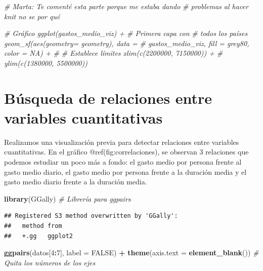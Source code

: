 \documentclass[data,article,submit,moreauthors,pdftex]{Definitions/mdpi}
\newenvironment{Shaded}{\begin{snugshade}}{\end{snugshade}}
\newcommand{\AttributeTok}[1]{\textcolor[rgb]{0.13,0.29,0.53}{#1}}
\newcommand{\CommentTok}[1]{\textcolor[rgb]{0.56,0.35,0.01}{\textit{#1}}}
\newcommand{\ConstantTok}[1]{\textcolor[rgb]{0.56,0.35,0.01}{#1}}
\newcommand{\DecValTok}[1]{\textcolor[rgb]{0.00,0.00,0.81}{#1}}
\newcommand{\FunctionTok}[1]{\textcolor[rgb]{0.13,0.29,0.53}{\textbf{#1}}}
\newcommand{\NormalTok}[1]{#1}
\newcommand{\SpecialCharTok}[1]{\textcolor[rgb]{0.81,0.36,0.00}{\textbf{#1}}}
\begin{document}
\begin{Shaded}
\begin{Highlighting}[]
\CommentTok{\# Marta: Te comenté esta parte porque me estaba dando}
\CommentTok{\# problemas al hacer knit no se por qué}

\CommentTok{\# Gráfico ggplot(gastos\_medio\_viz) + \# Primera capa con}
\CommentTok{\# todos los países geom\_sf(aes(geometry= geometry), data =}
\CommentTok{\# gastos\_medio\_viz, fill = \textquotesingle{}grey80\textquotesingle{}, color = NA) + \#}
\CommentTok{\# Establece límites xlim(c(2200000, 7150000)) +}
\CommentTok{\# ylim(c(1380000, 5500000))}
\end{Highlighting}
\end{Shaded}

\section{Búsqueda de relaciones entre variables
cuantitativas}\label{buxfasqueda-de-relaciones-entre-variables-cuantitativas}

Realizamos una visualización previa para detectar relaciones entre
variables cuantitativas. En el gráfico @ref(fig:correlaciones), se
observan 3 relaciones que podemos estudiar un poco más a fondo: el gasto
medio por persona frente al gasto medio diario, el gasto medio por
persona frente a la duración media y el gasto medio diario frente a la
duración media.

\begin{Shaded}
\begin{Highlighting}[]
\FunctionTok{library}\NormalTok{(GGally)  }\CommentTok{\# Librería para ggpairs}
\end{Highlighting}
\end{Shaded}

\begin{verbatim}
## Registered S3 method overwritten by 'GGally':
##   method from   
##   +.gg   ggplot2
\end{verbatim}

\begin{Shaded}
\begin{Highlighting}[]
\FunctionTok{ggpairs}\NormalTok{(datos[}\DecValTok{4}\SpecialCharTok{:}\DecValTok{7}\NormalTok{], }\AttributeTok{label =} \ConstantTok{FALSE}\NormalTok{) }\SpecialCharTok{+} \FunctionTok{theme}\NormalTok{(}\AttributeTok{axis.text =} \FunctionTok{element\_blank}\NormalTok{())  }\CommentTok{\# Quita los números de los ejes}
\end{Highlighting}
\end{Shaded}
\end{document}
